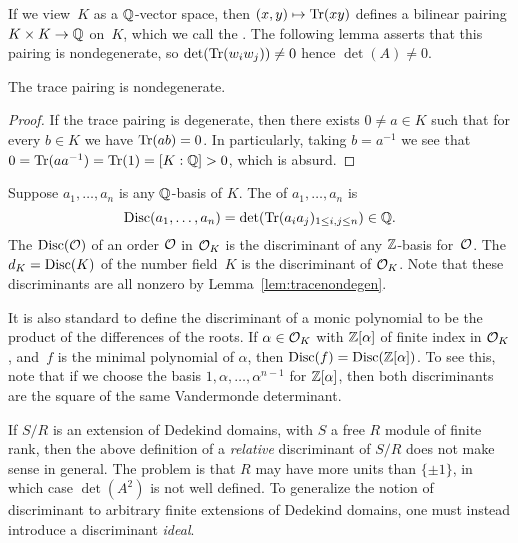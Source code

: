 If we view~$K$ as a $\mathbb{Q}$-vector space, then $(x,y)\mapsto \operatorname{Tr}(xy)$
defines a bilinear pairing $K\times K \to \mathbb{Q}$ on~$K$, which we call
the .  The following lemma asserts that this
pairing is nondegenerate, so $\det(\operatorname{Tr}(w_i w_j))\neq 0$ hence
$\det(A)\neq 0$.
\begin{lemma}\label{lem:tracenondegen}
The trace pairing is nondegenerate.
\end{lemma}
\begin{proof}
If the trace pairing is degenerate, then there exists $0\neq a\in K$ such
that for every $b\in K$ we have $\operatorname{Tr}(ab)=0$.  In particularly, taking
$b=a^{-1}$ we see that $0=\operatorname{Tr}(a a^{-1})=\operatorname{Tr}(1)=[K:\mathbb{Q}]>0$, which is
absurd.
\end{proof}

\begin{definition}[Discriminant]\label{def:disc}
Suppose $a_1,\ldots, a_n$ is any $\mathbb{Q}$-basis of $K$.  The 
of $a_1,\ldots, a_n$ is
$$
  \operatorname{Disc}(a_1,\ldots,a_n) = \det(\operatorname{Tr}(a_i a_j)_{1\leq i,j\leq n})\in\mathbb{Q}.
$$
The  $\operatorname{Disc}(\mathcal{O})$ of an order $\mathcal{O}$ in $\mathcal{O}_K$ is
the discriminant of any $\mathbb{Z}$-basis for~$\mathcal{O}$.
The  $d_K=\operatorname{Disc}(K)$ of the number field~$K$
is the discriminant of $\mathcal{O}_K$.
Note that these discriminants are all nonzero
by Lemma~\ref{lem:tracenondegen}.
\end{definition}

\begin{remark}
  It is also standard to define the discriminant of a monic polynomial
  to be the product of the differences of the roots.  If $\alpha\in
  \mathcal{O}_K$ with $\mathbb{Z}[\alpha]$ of finite index in $\mathcal{O}_K$, and~$f$ is the
  minimal polynomial of $\alpha$, then $\operatorname{Disc}(f)=\operatorname{Disc}(\mathbb{Z}[\alpha])$.
  To see this, note that if we choose the basis
  $1,\alpha,\ldots,\alpha^{n-1}$ for $\mathbb{Z}[\alpha]$, then both
  discriminants are the square of the same Vandermonde determinant.
\end{remark}



\begin{remark}
If $S/R$ is an extension of Dedekind domains, with $S$ a free $R$
module of finite rank, then the above definition of a {\em relative}
discriminant of $S/R$ does not make sense in general.  The problem
is that $R$ may have more units than $\{\pm 1\}$, in which case
$\det(A^2)$ is not well defined.   To generalize the notion of
discriminant to arbitrary finite extensions of Dedekind domains,
one must instead introduce a discriminant {\em ideal}.
\end{remark}

